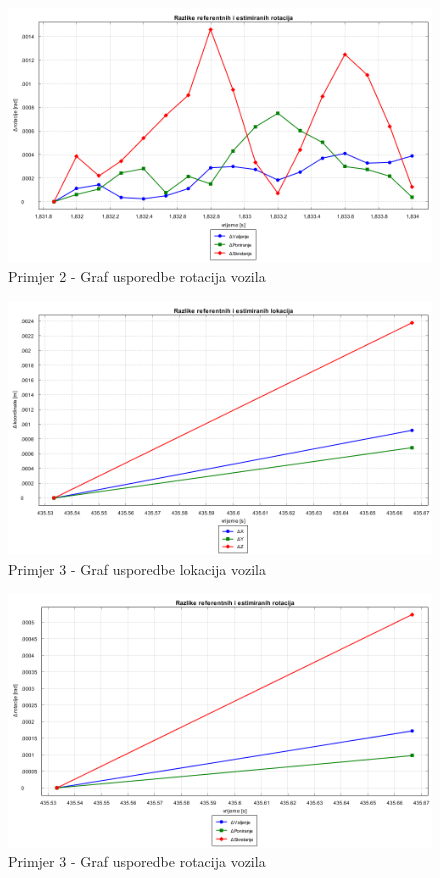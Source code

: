 \begin{figure}[H]
  \includegraphics[scale=0.4]{images/imgsvox/2_ravno_rotacije.png}
  \caption{Primjer 2 - Graf usporedbe rotacija vozila}
  \label{eval:primjer_2_rotacija_vox}
\end{figure}
\begin{figure}[H]
  \includegraphics[scale=0.4]{images/imgsvox/3_ravno_lokacije.png}
  \caption{Primjer 3 - Graf usporedbe lokacija vozila}
  \label{eval:primjer_3_rotacija_vox}
\end{figure}
\begin{figure}[H]
  \includegraphics[scale=0.4]{images/imgsvox/3_ravno_rotacije.png}
  \caption{Primjer 3 - Graf usporedbe rotacija vozila}
  \label{eval:primjer_3_rotacija_vox}
\end{figure}
